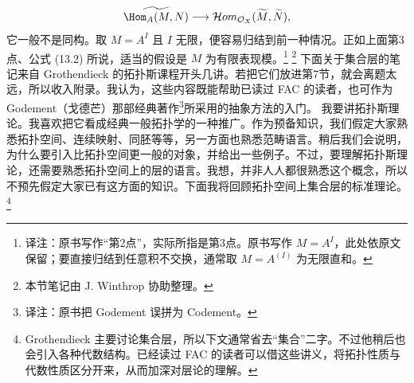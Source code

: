 \[
 \widetilde{\Hom_A(M,N)}\longrightarrow
 \mathcal{H}om_{\mathcal O_X}(\widetilde M,\widetilde N),
\]
它一般不是同构。取 $M=A^I$ 且 $I$ 无限，便容易归结到前一种情况。正如上面第3点、公式 (13.2) 所说，适当的假设是 $M$ 为有限表现模。\footnote{译注：原书写作“第2点”，实际所指是第3点。原书写作 $M=A^I$，此处依原文保留；要直接归结到任意积不交换，通常取 $M=A^{(I)}$ 为无限直和。}
\footnote{本节笔记由 J. Winthrop 协助整理。}
下面关于集合层的笔记来自 Grothendieck 的拓扑斯课程开头几讲。若把它们放进第7节，就会离题太远，所以收入附录。我认为，这些内容既能帮助已读过 FAC 的读者，也可作为 Godement（戈德芒）那部经典著作\footnote{译注：原书把 Godement 误拼为 Codement。}所采用的抽象方法的入门。
我要讲拓扑斯理论。我喜欢把它看成经典一般拓扑学的一种推广。作为预备知识，我们假定大家熟悉拓扑空间、连续映射、同胚等等，另一方面也熟悉范畴语言。稍后我们会说明，为什么要引入比拓扑空间更一般的对象，并给出一些例子。不过，要理解拓扑斯理论，还需要熟悉拓扑空间上的层的语言。我想，并非人人都很熟悉这个概念，所以不预先假定大家已有这方面的知识。下面我将回顾拓扑空间上集合层的标准理论。\footnote{Grothendieck 主要讨论集合层，所以下文通常省去“集合”二字。不过他稍后也会引入各种代数结构。已经读过 FAC 的读者可以借这些讲义，将拓扑性质与代数性质区分开来，从而加深对层论的理解。}
